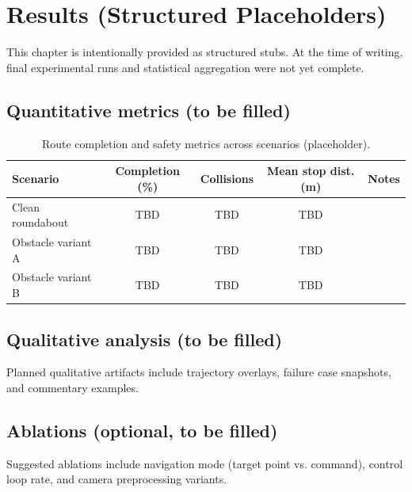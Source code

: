 \chapter{Results (Structured Placeholders)}
\label{ch:results}

This chapter is intentionally provided as structured stubs. At the time of writing, final experimental runs and statistical aggregation were not yet complete.

\section{Quantitative metrics (to be filled)}
\begin{table}[h]
\centering
\caption{Route completion and safety metrics across scenarios (placeholder).}
\label{tab:results-main}
\begin{tabular}{lcccc}
\toprule
Scenario & Completion (\%) & Collisions & Mean stop dist. (m) & Notes\\
\midrule
Clean roundabout & TBD & TBD & TBD & \\
Obstacle variant A & TBD & TBD & TBD & \\
Obstacle variant B & TBD & TBD & TBD & \\
\bottomrule
\end{tabular}
\end{table}

\section{Qualitative analysis (to be filled)}
Planned qualitative artifacts include trajectory overlays, failure case snapshots, and commentary examples.

\section{Ablations (optional, to be filled)}
Suggested ablations include navigation mode (target point vs. command), control loop rate, and camera preprocessing variants.
